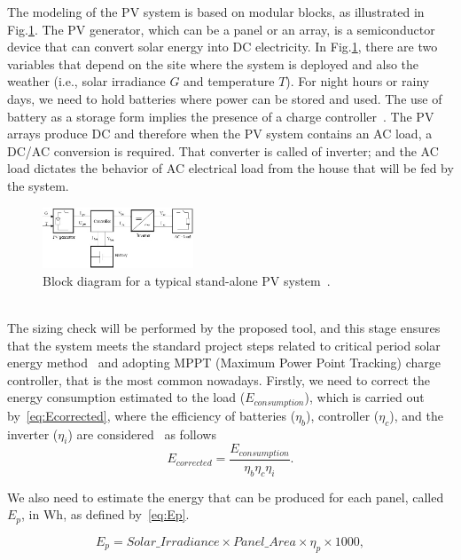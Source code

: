 \documentclass[10pt,conference]{IEEEtran}
\begin{document}
The modeling of the PV system is based on modular blocks, as illustrated in Fig.\ref{fig:blockdiagram}. %
The PV generator, which can be a panel or an array, is a semiconductor device that can convert solar energy into DC electricity. In Fig.\ref{fig:blockdiagram}, there are two variables that depend on the site where the system is deployed and also the weather (i.e., solar irradiance $G$ and temperature $T$). For night hours or rainy days, we need to hold batteries where power can be stored and used. The use of battery as a storage form implies the presence of a charge controller~\cite{Hansen}. The PV arrays produce DC and therefore when the PV system contains an AC load, a DC/AC conversion is required. That converter is called of inverter; and the AC load dictates the behavior of AC electrical load from the house that will be fed by the system.
\begin{figure}[h]
\includegraphics[width=0.4\textwidth]{blockdiagramPVS2}
\centering
\caption{Block diagram for a typical stand-alone PV system~\cite{Hansen}.}
\label{fig:blockdiagram} 
\end{figure}
\\

The sizing check will be performed by the proposed tool, and this stage ensures that the system meets the standard project steps related to critical period solar energy method~\cite{Pinho} and adopting MPPT (Maximum Power Point Tracking) charge controller, that is the most common nowadays. 
%
Firstly, we need to correct the energy consumption estimated to the load ($E_{consumption}$), which is carried out by~\eqref{eq:Ecorrected}, where the efficiency of batteries ($\eta_{b}$), controller ($\eta_{c}$), and the inverter ($\eta_{i}$) are considered~\cite{Pinho} as follows
\begin{equation}
\label{eq:Ecorrected}
\scriptstyle E_{corrected} = \dfrac{\scriptstyle E_{consumption}}{ \scriptstyle \eta_{b} \eta_{c} \eta_{i} }.
\end{equation}

We also need to estimate the energy that can be produced for each panel, called $E_{p}$, in Wh, as defined by~\eqref{eq:Ep}.

\begin{equation}
\label{eq:Ep}
\scriptstyle E_{p} = \scriptstyle Solar\_Irradiance \times Panel\_Area \times \eta_{p} \times 1000,
\end{equation}
\end{document}
